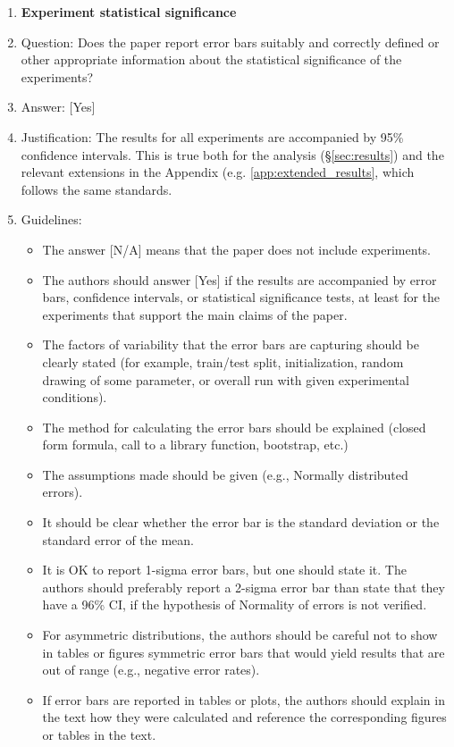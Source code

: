 \documentclass{llmxive}
\providecommand{\answerYes}[1][]{[Yes]#1}
\providecommand{\answerNA}[1][]{[N/A]#1}
\begin{document}
\begin{enumerate}
\item {\bf Experiment statistical significance}
    \item[] Question: Does the paper report error bars suitably and correctly defined or other appropriate information about the statistical significance of the experiments?
    \item[] Answer: \answerYes{}
    \item[] Justification: The results for all experiments are accompanied by 95\% confidence intervals. This is true both for the analysis (\S\ref{sec:results}) and the relevant extensions in the Appendix (e.g. \ref{app:extended_results}, which follows the same standards.
    \item[] Guidelines:
    \begin{itemize}
        \item The answer \answerNA{} means that the paper does not include experiments.
        \item The authors should answer \answerYes{} if the results are accompanied by error bars, confidence intervals, or statistical significance tests, at least for the experiments that support the main claims of the paper.
        \item The factors of variability that the error bars are capturing should be clearly stated (for example, train/test split, initialization, random drawing of some parameter, or overall run with given experimental conditions).
        \item The method for calculating the error bars should be explained (closed form formula, call to a library function, bootstrap, etc.)
        \item The assumptions made should be given (e.g., Normally distributed errors).
        \item It should be clear whether the error bar is the standard deviation or the standard error of the mean.
        \item It is OK to report 1-sigma error bars, but one should state it. The authors should preferably report a 2-sigma error bar than state that they have a 96\% CI, if the hypothesis of Normality of errors is not verified.
        \item For asymmetric distributions, the authors should be careful not to show in tables or figures symmetric error bars that would yield results that are out of range (e.g., negative error rates).
        \item If error bars are reported in tables or plots, the authors should explain in the text how they were calculated and reference the corresponding figures or tables in the text.
    \end{itemize}


\end{enumerate}
\end{document}
